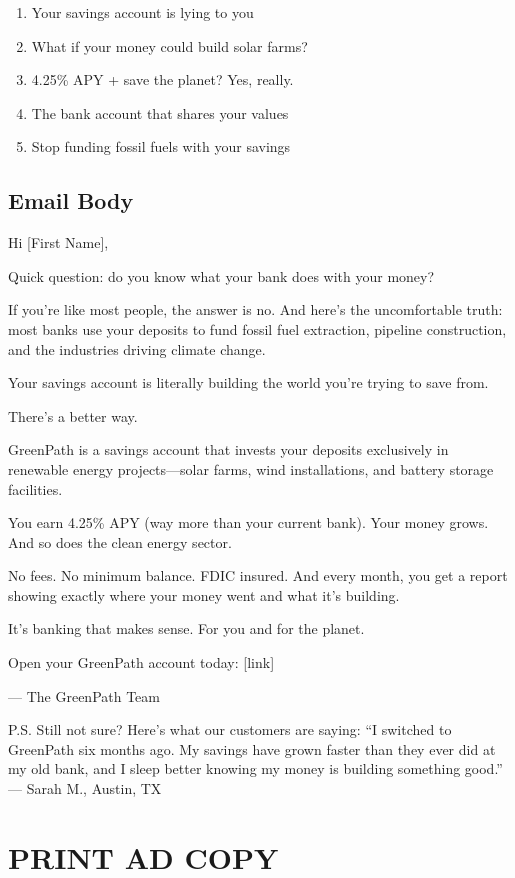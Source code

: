 \documentclass[
    language=english,
    doctype=advertising-copy,
    institution=none,
]{../../omnilatex}
\begin{document}
\begin{enumerate}
    \item Your savings account is lying to you
    \item What if your money could build solar farms?
    \item 4.25\% APY + save the planet? Yes, really.
    \item The bank account that shares your values
    \item Stop funding fossil fuels with your savings
\end{enumerate}

\subsection*{Email Body}

Hi [First Name],

Quick question: do you know what your bank does with your money?

If you're like most people, the answer is no. And here's the uncomfortable truth: most banks use your deposits to fund fossil fuel extraction, pipeline construction, and the industries driving climate change.

Your savings account is literally building the world you're trying to save from.

There's a better way.

GreenPath is a savings account that invests your deposits exclusively in renewable energy projects---solar farms, wind installations, and battery storage facilities.

You earn 4.25\% APY (way more than your current bank). Your money grows. And so does the clean energy sector.

No fees. No minimum balance. FDIC insured. And every month, you get a report showing exactly where your money went and what it's building.

It's banking that makes sense. For you and for the planet.

Open your GreenPath account today: [link]

--- The GreenPath Team

P.S. Still not sure? Here's what our customers are saying: ``I switched to GreenPath six months ago. My savings have grown faster than they ever did at my old bank, and I sleep better knowing my money is building something good.'' --- Sarah M., Austin, TX

\section*{PRINT AD COPY}
\end{document}
